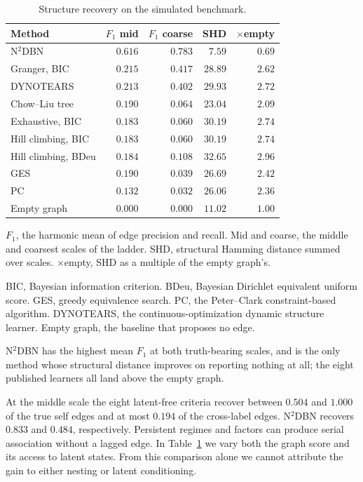 \documentclass[sigconf]{acmart}
\begin{document}
\begin{table}[t]
\caption{Structure recovery on the simulated benchmark.}
\label{tab:exp-recovery}
\small
\begin{threeparttable}
\begin{tabular}{lrrrr}
\toprule
Method & $F_1$ mid & $F_1$ coarse & SHD & $\times$empty \\
\midrule
N$^2$DBN & $\mathbf{0.616}$ & $\mathbf{0.783}$ & $\mathbf{7.59}$ & $\mathbf{0.69}$ \\
\midrule
Granger, BIC & $0.215$ & $0.417$ & $28.89$ & $2.62$ \\
DYNOTEARS & $0.213$ & $0.402$ & $29.93$ & $2.72$ \\
Chow--Liu tree & $0.190$ & $0.064$ & $23.04$ & $2.09$ \\
Exhaustive, BIC & $0.183$ & $0.060$ & $30.19$ & $2.74$ \\
Hill climbing, BIC & $0.183$ & $0.060$ & $30.19$ & $2.74$ \\
Hill climbing, BDeu & $0.184$ & $0.108$ & $32.65$ & $2.96$ \\
GES & $0.190$ & $0.039$ & $26.69$ & $2.42$ \\
PC & $0.132$ & $0.032$ & $26.06$ & $2.36$ \\
\midrule
Empty graph & $0.000$ & $0.000$ & $11.02$ & $1.00$ \\
\bottomrule
\end{tabular}
\begin{tablenotes}[flushleft]\footnotesize
\item $F_1$, the harmonic mean of edge precision and recall. Mid and coarse, the middle and coarsest scales of the ladder. SHD, structural Hamming distance summed over scales. $\times$empty, SHD as a multiple of the empty graph's.
\item BIC, Bayesian information criterion. BDeu, Bayesian Dirichlet equivalent uniform score. GES, greedy equivalence search. PC, the Peter--Clark constraint-based algorithm. DYNOTEARS, the continuous-optimization dynamic structure learner. Empty graph, the baseline that proposes no edge.
\end{tablenotes}
\end{threeparttable}
\end{table}

N$^2$DBN has the highest mean $F_1$ at both truth-bearing scales, and is the only method whose structural distance improves on reporting nothing at all; the eight published learners all land above the empty graph.

At the middle scale the eight latent-free criteria recover between \(0.504\) and \(1.000\) of the true self edges and at most \(0.194\) of the cross-label edges. N$^2$DBN recovers \(0.833\) and \(0.484\), respectively. Persistent regimes and factors can produce serial association without a lagged edge. In Table~\ref{tab:exp-recovery} we vary both the graph score and its access to latent states. From this comparison alone we cannot attribute the gain to either nesting or latent conditioning.
\end{document}
